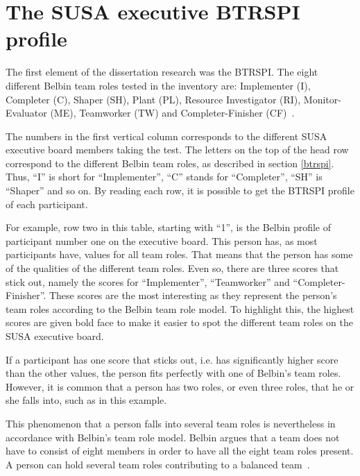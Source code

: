\documentclass[a4paper,12pt,titlepage]{report}
\begin{document}
  \section{The SUSA executive BTRSPI profile}
  The first element of the dissertation research was the BTRSPI.
  The eight different Belbin team roles tested in the inventory are:
  Implementer (I), Completer (C), Shaper (SH), Plant (PL),
  Resource Investigator (RI), Monitor-Evaluator (ME), Teamworker (TW)
  and Completer-Finisher (CF)~\citep{rmb}.

  The numbers in the first vertical column corresponds to
  the different SUSA executive board members taking the test.
  The letters on the top of the head row correspond to the different
  Belbin team roles, as described in section \ref{btrspi}.
  Thus, ``I'' is short for ``Implementer'', ``C'' stands for ``Completer'',
  ``SH'' is ``Shaper'' and so on. By reading each row, it is possible
  to get the BTRSPI profile of each participant.

  For example, row two in this table, starting with ``1'',
  is the Belbin profile of participant number one on the executive board.
  This person has, as most participants have, values for
  all team roles. That means that the person has some of the qualities of the
  different team roles. Even so, there are three scores that stick out,
  namely the scores for ``Implementer'', ``Teamworker''
  and ``Completer-Finisher''. These scores are the most interesting as they
  represent the person's team roles according to the Belbin team role model.
  To highlight this, the highest scores are given bold face to make
  it easier to spot the different team roles on the SUSA executive board.
  
  If a participant has one score that sticks out, i.e. has significantly
  higher score than the other values, the person fits perfectly with
  one of Belbin's team roles. However, it is common that a person has
  two roles, or even three roles, that he or she falls into,
  such as in this example.

  This phenomenon that a person falls into
  several team roles is nevertheless in accordance with Belbin's
  team role model. Belbin argues that a team does not have to consist of
  eight members in order to have all the eight team roles present.
  A person can hold several team roles contributing to a balanced
  team~\citep{rmb}.
\end{document}
